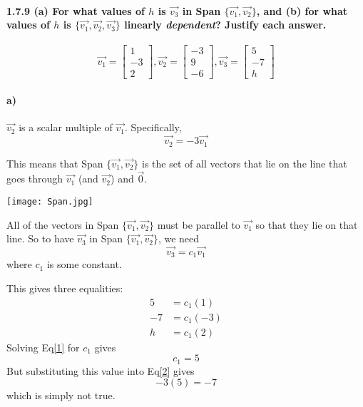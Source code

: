 \documentclass[12pt, oneside]{article}   	%
\begin{document}
\paragraph*{\textbf{1.7.9 (a) For what values of $h$ is $\vec{v_3}$ in Span $\{\vec{v_1},\vec{v_2}\}$, and (b) for what values of $h$ is $\{\vec{v_1},\vec{v_2},\vec{v_3}\}$ linearly \emph{dependent}?
Justify each answer.}}
\[ \vec{v_1}= \left[ \begin{array}{r}
1\\
-3\\
2\end{array}\right ] , 
 \vec{v_2}= \left[ \begin{array}{r}
-3\\
9\\
-6\end{array}\right ] ,
\vec{v_3}= \left[ \begin{array}{r}
5\\
-7\\
h\end{array}\right ] \]

\paragraph{a)} $\vec{v_2}$ is a scalar multiple of $\vec{v_1}$. Specifically, 
\begin{equation}
\vec{v_2}=-3\vec{v_1}
\end{equation}

This means that Span $\{\vec{v_1},\vec{v_2}\}$ is the set of all vectors that lie on the line that goes through $\vec{v_1}$ (and $\vec{v_2}$) and $\vec{0}$. 

\begin{center}
\texttt{[image: Span.jpg]}
\end{center}

All of the vectors in Span $\{\vec{v_1},\vec{v_2}\}$ must be parallel to $\vec{v_1}$ so that they lie on that line. So to have $\vec{v_3}$ in Span $\{\vec{v_1},\vec{v_2}\}$, we need
\begin{equation}\label{da}
\vec{v_3}=c_1\vec{v_1}
\end{equation}
where $c_1$ is some constant.

This gives three equalities:
\begin{align}
5&=c_1 (1)\label{1}\\
-7&=c_1(-3)\label{2}\\
h&=c_1(2)\label{3}
\end{align}
Solving Eq\eqref{1} for $c_1$ gives
\begin{equation}
c_1=5
\end{equation}
But substituting this value into Eq\eqref{2} gives
\begin{equation}
-3(5)=-7
\end{equation}
which is simply not true.
\end{document}
